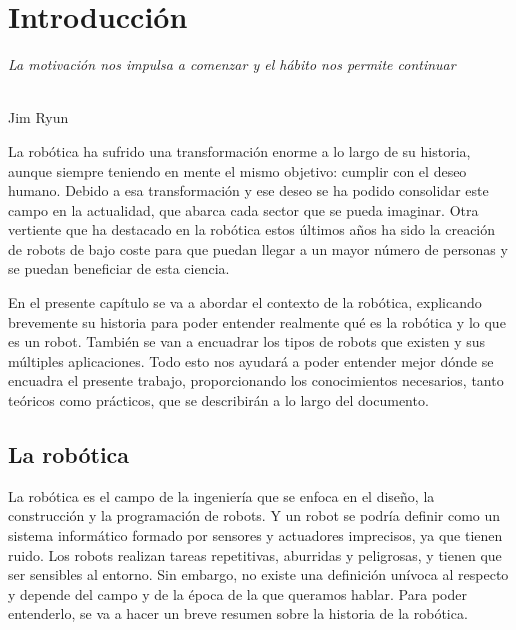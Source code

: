 \chapter{Introducción}
\label{cap:capitulo1}
\setcounter{page}{1}

\begin{flushright}
\begin{minipage}[]{10cm}
\emph{La motivación nos impulsa a comenzar y el hábito nos permite continuar}\\
\end{minipage}\\

Jim Ryun\\
\end{flushright}

\vspace{1cm}

La robótica ha sufrido una transformación enorme a lo largo de su historia, aunque siempre teniendo en mente el mismo objetivo: cumplir con el deseo humano. Debido a esa transformación y ese deseo se ha podido consolidar este campo en la actualidad, que abarca cada sector que se pueda imaginar. Otra vertiente que ha destacado en la robótica estos últimos años ha sido la creación de robots de bajo coste para que puedan llegar a un mayor número de personas y se puedan beneficiar de esta ciencia. 

En el presente capítulo se va a abordar el contexto de la robótica, explicando brevemente su historia para poder entender realmente qué es la robótica y lo que es un robot. También se van a encuadrar los tipos de robots que existen y sus múltiples aplicaciones. Todo esto nos ayudará a poder entender mejor dónde se encuadra el presente trabajo, proporcionando los conocimientos necesarios, tanto teóricos como prácticos, que se describirán a lo largo del documento.

\section{La robótica}
\label{sec:robotica} %

La robótica es el campo de la ingeniería que se enfoca en el diseño, la construcción y la programación de robots. Y un robot se podría definir como un sistema informático formado por sensores y actuadores imprecisos, ya que tienen ruido. Los robots realizan tareas repetitivas, aburridas y peligrosas, y tienen que ser sensibles al entorno. Sin embargo, no existe una definición unívoca al respecto y depende del campo y de la época de la que queramos hablar. Para poder entenderlo, se va a hacer un breve resumen sobre la historia de la robótica.\\

